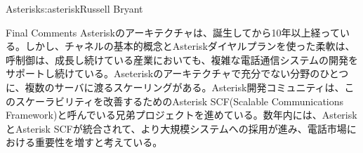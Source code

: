 \begin{aosachapter}{Asterisk}{s:asterisk}{Russell Bryant}
\begin{aosasect1}{Final Comments}
Asteriskのアーキテクチャは、誕生してから10年以上経っている。しかし、チャネルの基本的概念とAsteriskダイヤルプランを使った柔軟は、呼制御は、成長し続けている産業においても、複雑な電話通信システムの開発をサポートし続けている。Aseteriskのアーキテクチャで充分でない分野のひとつに、複数のサーバに渡るスケーリングがある。Asterisk開発コミュニティは、このスケーラビリティを改善するためのAsterisk SCF(Scalable Communications Framework)と呼んでいる兄弟プロジェクトを進めている。数年内には、AsteriskとAsterisk SCFが統合されて、より大規模システムへの採用が進み、電話市場における重要性を増すと考えている。

\end{aosasect1}

\end{aosachapter}
